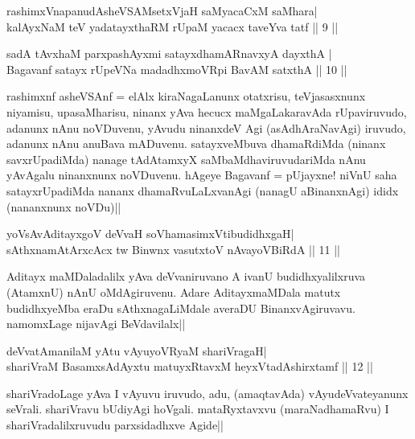 
\begin{shl}
rashimxVnapanudAsheVSAMsetxVjaH saMyacaCxM saMhara| \\
kalAyxNaM teV yadatayxthaRM rUpaM yacacx taveYva tatf \hfill||  9 || 
\end{shl}

\begin{shl}
sadA tAvx\s haM parxpashAyxmi satayxdhamARnavxyA dayxthA | \\
Bagavanf satayx rUpeVNa madadhxmoVR\s pi BavAM satxthA \hfill||  10 || 
\end{shl}

\begin{artha} 
rashimxnf asheVSAnf = elAlx kiraNagaLanunx otatxrisu, teVjasasxnunx 
niyamisu, upasaMharisu, ninanx yAva hecucx maMgaLakaravAda 
rUpaviruvudo, adanunx nAnu noVDuvenu, yAvudu ninanxdeV Agi 
(asAdhAraNavAgi) iruvudo, adanunx nAnu anuBava mADuvenu. satayxveMbuva 
dhamaRdiMda (ninanx savxrUpadiMda) nanage tAdAtamxyX 
saMbaMdhaviruvudariMda nAnu yAvAgalu ninanxnunx noVDuvenu. hAgeye 
Bagavanf = pUjayxne! niVnU saha satayxrUpadiMda nananx 
dhamaRvuLaLxvanAgi (nanagU aBinanxnAgi) ididx (nananxnunx noVDu)||
\end{artha}


\begin{shl}
yoV\s sAvAditayxgoV deVvaH soV\s hamasimxVtibudidhxgaH| \\
sAthxnamAtArxcAcx tw Binwnx vasutxtoV nA\s \s vayoVBiRdA \hfill||  11 || 
\end{shl}

\begin{artha} 
Aditayx maMDaladalilx yAva deVvaniruvano A ivanU budidhxyalilxruva 
(AtamxnU) nAnU oMdAgiruvenu. Adare AditayxmaMDala matutx budidhxyeMba 
eraDu sAthxnagaLiMdale averaDU BinanxvAgiruvavu. namomxLage nijavAgi 
BeVdavilalx||
\end{artha}


\begin{shl}
deVvatAmanilaM yAtu vAyuyoVR\s yaM shariVragaH| \\
shariVraM BasamxsAdAyxtu matuyxRtavxM heyxVtadAshirxtamf \hfill||  12 || 
\end{shl}

\begin{artha} 
shariVradoLage yAva I vAyuvu iruvudo, adu, (amaqtavAda) 
vAyudeVvateyanunx seVrali. shariVravu bUdiyAgi hoVgali. mataRyxtavxvu 
(maraNadhamaRvu) I shariVradalilxruvudu parxsidadhxve Agide||
\end{artha}

